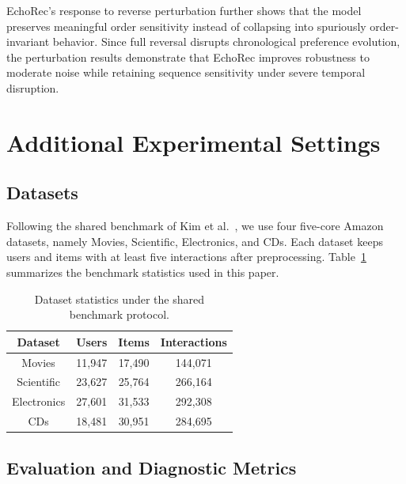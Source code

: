 ﻿\documentclass{article}
\begin{document}
EchoRec's response to reverse perturbation further shows that the model preserves meaningful order sensitivity instead of collapsing into spuriously order-invariant behavior. Since full reversal disrupts chronological preference evolution, the perturbation results demonstrate that EchoRec improves robustness to moderate noise while retaining sequence sensitivity under severe temporal disruption.

\section{Additional Experimental Settings}
\label{app:exp_settings}

\subsection{Datasets}
\label{app:datasets}

Following the shared benchmark of Kim et al.~\cite{kim2025lost}, we use four five-core Amazon datasets, namely Movies, Scientific, Electronics, and CDs. Each dataset keeps users and items with at least five interactions after preprocessing. Table~\ref{tab:dataset_stats} summarizes the benchmark statistics used in this paper.

\begin{table}[!t]
\centering
\caption{Dataset statistics under the shared benchmark protocol.}
\label{tab:dataset_stats}
\small
\setlength{\tabcolsep}{7pt}
\renewcommand{\arraystretch}{1.1}
\begin{tabular}{cccc}
\toprule
\textbf{Dataset} & \textbf{Users} & \textbf{Items} & \textbf{Interactions} \\
\midrule
Movies & 11,947 & 17,490 & 144,071 \\
Scientific & 23,627 & 25,764 & 266,164 \\
Electronics & 27,601 & 31,533 & 292,308 \\
CDs & 18,481 & 30,951 & 284,695 \\
\bottomrule
\end{tabular}
\end{table}

\subsection{Evaluation and Diagnostic Metrics}
\label{app:metrics}
\end{document}
